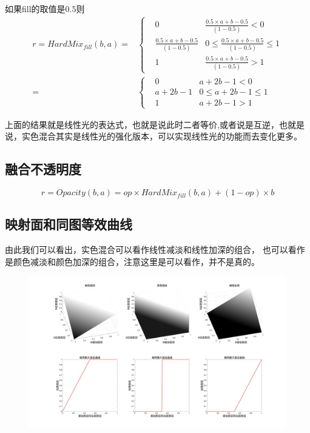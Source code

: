 如果fill的取值是$0.5$则
\begin{equation}\begin{aligned}r=HardMix_{fill}(b,a)=&\left\{ \begin{aligned}&0&  \frac{0.5\times a+b-0.5}{(1-0.5)}<0\\ &\frac{0.5\times a+b-0.5}{(1-0.5)}&0\leq \frac{0.5\times a+b-0.5}{(1-0.5)}\leq 1\\&1&  \frac{0.5\times a+b-0.5}{(1-0.5)}>1  \end{aligned}\right.\\=&\left\{ \begin{aligned}&0&  a+2b-1<0\\ &a+2b-1&0\leq a+2b-1\leq 1\\ &1&  a+2b-1>1    \end{aligned}\right.\end{aligned}\end{equation}
\begin{notice}
\item 上面的结果就是线性光的表达式，也就是说此时二者等价,或者说是互逆，也就是说，实色混合其实是线性光的强化版本，可以实现线性光的功能而去变化更多。
\end{notice}


\subsection{ 融合不透明度}

\begin{equation}r=Opacity(b,a)=op\times HardMix_{fill}(b,a)+(1-op)\times b\end{equation}

\subsection{ 映射面和同图等效曲线}

由此我们可以看出，实色混合可以看作线性减淡和线性加深的组合，
也可以看作是颜色减淡和颜色加深的组合，注意这里是可以看作，并不是真的。

\begin{figure}[h!]
	\centering
	\includegraphics[width=\linewidth]{figure/试色线性混合}
	\caption{}
	\label{fig:}
\end{figure}



